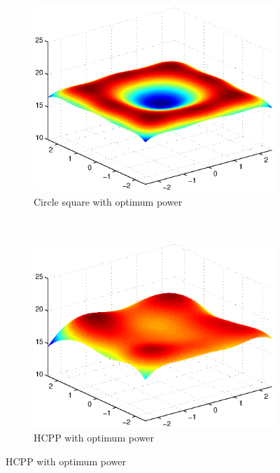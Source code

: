 \documentclass{beamer}
\theoremstyle{remark}
\begin{document}
\begin{frame}
\begin{figure}[!]
\begin{subfigure}{0.3\columnwidth}
\includegraphics[width=\columnwidth]{c4_cirSq_SNR_opt}
\caption{Circle square with optimum power}
\end{subfigure}~
\begin{subfigure}{0.3\columnwidth}
\includegraphics[width=\columnwidth]{c4_hcpp_SNR_opt}
\caption{HCPP with optimum power}
\end{subfigure}
    
\label{fig:SNR_profiles}
\end{figure}
\end{frame}
\end{document}
